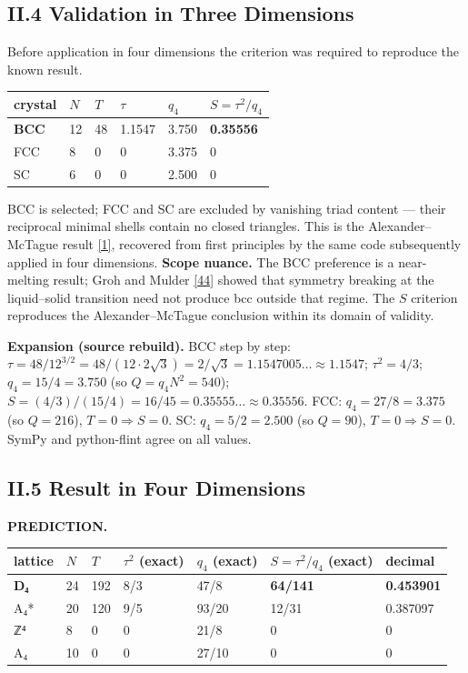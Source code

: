 \documentclass[a4paper,11pt]{article}
\newcommand{\expansion}[1]{\par\smallskip\noindent\textbf{Expansion (source rebuild).} #1\par\smallskip}
\begin{document}
\subsection*{II.4 Validation in Three Dimensions}

Before application in four dimensions the criterion was required to reproduce the known result.

\begin{center}
\begin{tabular}{llllll}
\hline
crystal & $N$ & $T$ & $\tau$ & $q_4$ & $S=\tau^2/q_4$ \\
\hline
\textbf{BCC} & 12 & 48 & 1.1547 & 3.750 & \textbf{0.35556} \\
FCC & 8 & 0 & 0 & 3.375 & 0 \\
SC & 6 & 0 & 0 & 2.500 & 0 \\
\hline
\end{tabular}
\end{center}

BCC is selected; FCC and SC are excluded by vanishing triad content — their reciprocal minimal shells contain no closed triangles. This is the Alexander–McTague result \hyperref[ref1]{[1]}, recovered from first principles by the same code subsequently applied in four dimensions. \textbf{Scope nuance.} The BCC preference is a near-melting result; Groh and Mulder \hyperref[ref44]{[44]} showed that symmetry breaking at the liquid–solid transition need not produce bcc outside that regime. The $S$ criterion reproduces the Alexander–McTague conclusion within its domain of validity.


\expansion{BCC step by step: $\tau = 48/12^{3/2} = 48/(12 \cdot 2\sqrt{3}) = 2/\sqrt{3} = 1.1547005\ldots \approx 1.1547$; $\tau^2 = 4/3$; $q_4 = 15/4 = 3.750$ (so $Q = q_4N^2 = 540$); $S = (4/3)/(15/4) = 16/45 = 0.35555\ldots \approx 0.35556$. FCC: $q_4 = 27/8 = 3.375$ (so $Q = 216$), $T = 0 \Rightarrow S = 0$. SC: $q_4 = 5/2 = 2.500$ (so $Q = 90$), $T = 0 \Rightarrow S = 0$. SymPy and python-flint agree on all values.}
\subsection*{II.5 Result in Four Dimensions}

\textbf{PREDICTION.}

\begin{center}
\begin{tabular}{lllllll}
\hline
lattice & $N$ & $T$ & $\tau^2$ (exact) & $q_4$ (exact) & $S=\tau^2/q_4$ (exact) & decimal \\
\hline
\textbf{D₄} & 24 & 192 & 8/3 & 47/8 & \textbf{64/141} & \textbf{0.453901} \\
A₄* & 20 & 120 & 9/5 & 93/20 & 12/31 & 0.387097 \\
ℤ⁴ & 8 & 0 & 0 & 21/8 & 0 & 0 \\
A₄ & 10 & 0 & 0 & 27/10 & 0 & 0 \\
\hline
\end{tabular}
\end{center}
\end{document}
